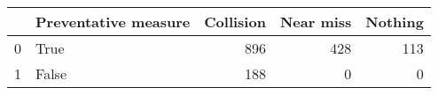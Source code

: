 \begin{tabular}{llrrr}
\toprule
{} &  Preventative measure &  Collision &  Near miss &  Nothing \\
\midrule
0 &                  True &        896 &        428 &      113 \\
1 &                 False &        188 &          0 &        0 \\
\bottomrule
\end{tabular}
